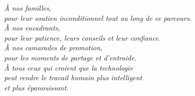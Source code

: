 \vspace*{3cm}

\begin{flushright}
\itshape\large

\textit{À nos familles,}\\[0.5em]
\textit{pour leur soutien inconditionnel tout au long de ce parcours.}\\[1.5em]

\textit{À nos encadrants,}\\[0.5em]
\textit{pour leur patience, leurs conseils et leur confiance.}\\[1.5em]

\textit{À nos camarades de promotion,}\\[0.5em]
\textit{pour les moments de partage et d'entraide.}\\[1.5em]

\textit{À tous ceux qui croient que la technologie}\\
\textit{peut rendre le travail humain plus intelligent}\\
\textit{et plus épanouissant.}

\end{flushright}
